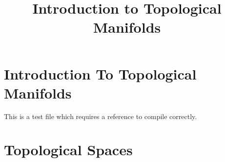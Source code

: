 


%


\title{Introduction to Topological Manifolds}


\maketitle

\label{section-phantom}

\tableofcontents

\section{Introduction To Topological Manifolds}
\label{section-introduction}

This is a test file which requires a reference to compile correctly. \cite{Maclane}

\section{Topological Spaces}
\label{section-topological-spaces}

